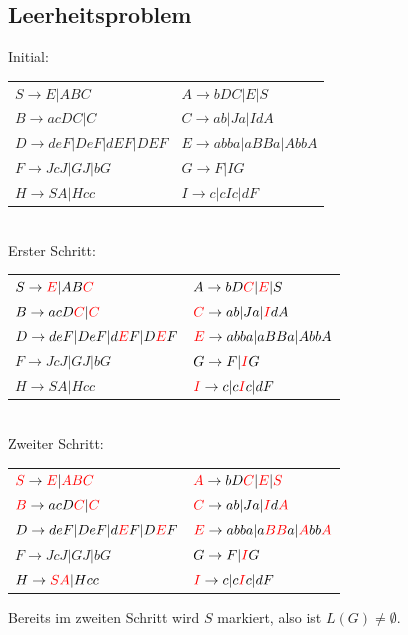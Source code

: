 \documentclass{article}
\begin{document}
\subsection*{Leerheitsproblem}
\begin{center}
Initial:\\
\begin{tabular}{ll}
$S \rightarrow E | ABC$               & $A \rightarrow bDC | E | S$ \\
$B \rightarrow acDC | C$              & $C \rightarrow ab | Ja | IdA$ \\
$D \rightarrow deF | DeF | dEF | DEF$ & $E \rightarrow abba | aBBa | AbbA$ \\
$F \rightarrow JcJ | GJ | bG$         & $G \rightarrow F | IG$ \\
$H \rightarrow SA | Hcc$              & $I \rightarrow c | cIc | dF$
\end{tabular}\\
Erster Schritt:\\
\begin{tabular}{ll}
$S \rightarrow {\color{red}E} | AB{\color{red}C}$               & $A \rightarrow bD{\color{red}C} | {\color{red}E} | S$ \\
$B \rightarrow acD{\color{red}C} | {\color{red}C}$              & ${\color{red}C} \rightarrow ab | Ja | {\color{red}I}dA$ \\
$D \rightarrow deF | DeF | d{\color{red}E}F | D{\color{red}E}F$ & ${\color{red}E} \rightarrow abba | aBBa | AbbA$ \\
$F \rightarrow JcJ | GJ | bG$                                   & $G \rightarrow F | {\color{red}I}G$ \\
$H \rightarrow SA | Hcc$                                        & ${\color{red}I} \rightarrow c | c{\color{red}I}c | dF$
\end{tabular}\\
Zweiter Schritt:\\
\begin{tabular}{ll}
${\color{red}S} \rightarrow {\color{red}E} | {\color{red}ABC}$  & ${\color{red}A} \rightarrow bD{\color{red}C} | {\color{red}E} | {\color{red}S}$ \\
${\color{red}B} \rightarrow acD{\color{red}C} | {\color{red}C}$ & ${\color{red}C} \rightarrow ab | Ja | {\color{red}I}d{\color{red}A}$ \\
$D \rightarrow deF | DeF | d{\color{red}E}F | D{\color{red}E}F$ & ${\color{red}E} \rightarrow abba | a{\color{red}BB}a | {\color{red}A}bb{\color{red}A}$ \\
$F \rightarrow JcJ | GJ | bG$                                   & $G \rightarrow F | {\color{red}I}G$ \\
$H \rightarrow {\color{red}SA} | Hcc$                           & ${\color{red}I} \rightarrow c | c{\color{red}I}c | dF$
\end{tabular}
\end{center}
Bereits im zweiten Schritt wird $S$ markiert, also ist $L(G) \neq \emptyset$.
\end{document}
